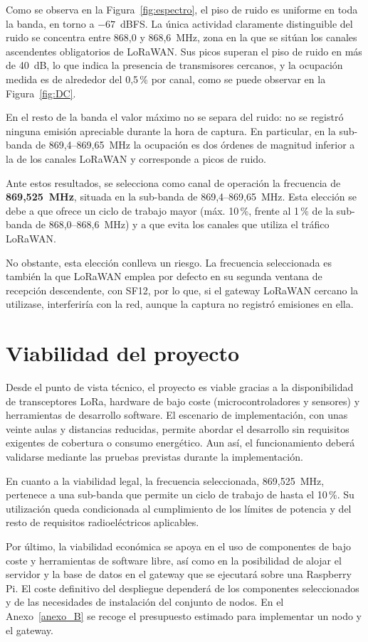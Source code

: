 Como se observa en la Figura~\ref{fig:espectro}, el piso de ruido es uniforme en toda la banda, en torno a $-67$~dBFS. La única actividad claramente distinguible del ruido se concentra entre 868,0 y 868,6~MHz, zona en la que se sitúan los canales ascendentes obligatorios de LoRaWAN. Sus picos superan el piso de ruido en más de 40~dB, lo que indica la presencia de transmisores cercanos, y la ocupación medida es de alrededor del 0,5\,\% por canal, como se puede observar en la Figura~\ref{fig:DC}.

En el resto de la banda el valor máximo no se separa del ruido: no se registró ninguna emisión apreciable durante la hora de captura. En particular, en la sub-banda de 869,4--869,65~MHz la ocupación es dos órdenes de magnitud inferior a la de los canales LoRaWAN y corresponde a picos de ruido.

Ante estos resultados, se selecciona como canal de operación la frecuencia de \textbf{869,525~MHz}, situada en la sub-banda de 869,4--869,65~MHz. Esta elección se debe a que ofrece un ciclo de trabajo mayor (máx. 10\,\%, frente al 1\,\% de la sub-banda de 868,0--868,6~MHz) y a que evita los canales que utiliza el tráfico LoRaWAN.

No obstante, esta elección conlleva un riesgo. La frecuencia seleccionada es también la que LoRaWAN emplea por defecto en su segunda ventana de recepción descendente, con SF12, por lo que, si el gateway LoRaWAN cercano la utilizase, interferiría con la red, aunque la captura no registró emisiones en ella.

\section{Viabilidad del proyecto}\label{sec:viabilidad}

Desde el punto de vista técnico, el proyecto es viable gracias a la disponibilidad de transceptores LoRa, hardware de bajo coste (microcontroladores y sensores) y herramientas de desarrollo software. El escenario de implementación, con unas veinte aulas y distancias reducidas, permite abordar el desarrollo sin requisitos exigentes de cobertura o consumo energético. Aun así, el funcionamiento deberá validarse mediante las pruebas previstas durante la implementación.

En cuanto a la viabilidad legal, la frecuencia seleccionada, 869,525~MHz, pertenece a una sub-banda que permite un ciclo de trabajo de hasta el 10\,\%. Su utilización queda condicionada al cumplimiento de los límites de potencia y del resto de requisitos radioeléctricos aplicables.

Por último, la viabilidad económica se apoya en el uso de componentes de bajo coste y herramientas de software libre, así como en la posibilidad de alojar el servidor y la base de datos en el gateway que se ejecutará sobre una Raspberry Pi. El coste definitivo del despliegue dependerá de los componentes seleccionados y de las necesidades de instalación del conjunto de nodos. En el Anexo~\ref{anexo_B} se recoge el presupuesto estimado para implementar un nodo y el gateway.